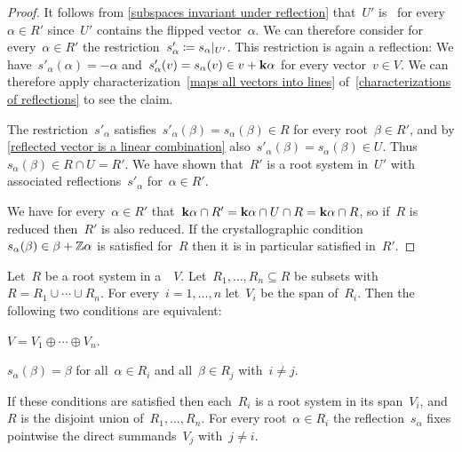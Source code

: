\begin{proof}
  It follows from \cref{subspaces invariant under reflection} that~$U'$ is~{} for every~$\alpha \in R'$ since~$U'$ contains the flipped vector~$\alpha$.
  We can therefore consider for every~$\alpha \in R'$ the restriction~$s'_\alpha \defined \restrict{s_\alpha}{U'}$.
  This restriction is again a reflection:
  We have~$s'_\alpha(\alpha) = -\alpha$ and~$s'_\alpha(v) = s_\alpha(v) \in v + \mathbf{k} \alpha$ for every vector~$v \in V$.
  We can therefore apply characterization~\ref{maps all vectors into lines} of~\cref{characterizations of reflections} to see the claim.
  
  The restriction~$s'_\alpha$ satisfies~$s'_\alpha(\beta) = s_\alpha(\beta) \in R$ for every root~$\beta \in R'$, and by \cref{reflected vector is a linear combination} also~$s'_\alpha(\beta) = s_\alpha(\beta) \in U$.
  Thus~$s_\alpha(\beta) \in R \cap U = R'$.
  We have shown that~$R'$ is a root system in~$U'$ with associated reflections~$s'_\alpha$ for~$\alpha \in R'$.
  
  We have for every~$\alpha \in R'$ that~$\mathbf{k} \alpha \cap R' = \mathbf{k} \alpha \cap U \cap R = \mathbf{k} \alpha \cap R$, so if~$R$ is reduced then~$R'$ is also reduced.
  If the crystallographic condition~$s_\alpha(\beta) \in \beta + \mathbb{Z} \alpha$ is satisfied for~$R$ then it is in particular satisfied in~$R'$.
\end{proof}


\begin{proposition}
  \label{decomposition of root systems}
  Let~$R$ be a root system in a~{\vectorspace{$\kf$}}~$V$.
  Let~$R_1, \dotsc, R_n \subseteq R$ be subsets with~$R = R_1 \cup \dotsb \cup R_n$.
  For every~$i = 1, \dotsc, n$ let~$V_i$ be the span of~$R_i$.
  Then the following two conditions are equivalent:
  \begin{equivalenceslist}
    \item
      \label{decomposition as vector spaces}
      $V = V_1 \oplus \dotsb \oplus V_n$.
    \item
      \label{leaving others invariant}
      $s_\alpha(\beta) = \beta$ for all~$\alpha \in R_i$ and all~$\beta \in R_j$ with~$i \neq j$.
  \end{equivalenceslist}
  If these conditions are satisfied then each~$R_i$ is a root system in its span~$V_i$, and~$R$ is the disjoint union of~$R_1, \dotsc, R_n$.
  For every root~$\alpha \in R_i$ the reflection~$s_\alpha$ fixes pointwise the direct summands~$V_j$ with~$j \neq i$.
\end{proposition}



